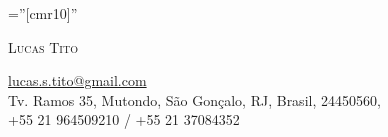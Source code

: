 \documentclass[a4paper,10pt]{article}
\begin{document}

\pagestyle{empty} %

\font\fb=''[cmr10]'' %

\begin{minipage}[b]{0.65\linewidth}
    \par{
    		{\Huge\textsc{Lucas Tito}
    }\smallskip\par}
        \href{mailto:lucas.s.tito@gmail.com}{lucas.s.tito@gmail.com}\\
        Tv. Ramos 35, Mutondo, São Gonçalo, RJ, Brasil, 24450560, \\
        +55 21 964509210 / +55 21 37084352\\
        
\end{minipage}
\hfill
\begin{minipage}[b]{0.35\linewidth}
\end{minipage}

\end{document}
